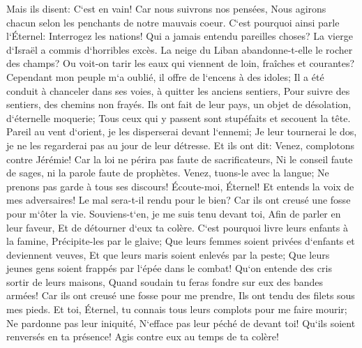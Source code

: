 \verse Mais ils disent: C`est en vain! Car nous suivrons nos pensées, Nous agirons chacun selon les penchants de notre mauvais coeur. 
\verse C`est pourquoi ainsi parle l`Éternel: Interrogez les nations! Qui a jamais entendu pareilles choses? La vierge d`Israël a commis d`horribles excès. 
\verse La neige du Liban abandonne-t-elle le rocher des champs? Ou voit-on tarir les eaux qui viennent de loin, fraîches et courantes? 
\verse Cependant mon peuple m`a oublié, il offre de l`encens à des idoles; Il a été conduit à chanceler dans ses voies, à quitter les anciens sentiers, Pour suivre des sentiers, des chemins non frayés. 
\verse Ils ont fait de leur pays, un objet de désolation, d`éternelle moquerie; Tous ceux qui y passent sont stupéfaits et secouent la tête. 
\verse Pareil au vent d`orient, je les disperserai devant l`ennemi; Je leur tournerai le dos, je ne les regarderai pas au jour de leur détresse. 
\verse Et ils ont dit: Venez, complotons contre Jérémie! Car la loi ne périra pas faute de sacrificateurs, Ni le conseil faute de sages, ni la parole faute de prophètes. Venez, tuons-le avec la langue; Ne prenons pas garde à tous ses discours! 
\verse Écoute-moi, Éternel! Et entends la voix de mes adversaires! 
\verse Le mal sera-t-il rendu pour le bien? Car ils ont creusé une fosse pour m`ôter la vie. Souviens-t`en, je me suis tenu devant toi, Afin de parler en leur faveur, Et de détourner d`eux ta colère. 
\verse C`est pourquoi livre leurs enfants à la famine, Précipite-les par le glaive; Que leurs femmes soient privées d`enfants et deviennent veuves, Et que leurs maris soient enlevés par la peste; Que leurs jeunes gens soient frappés par l`épée dans le combat! 
\verse Qu`on entende des cris sortir de leurs maisons, Quand soudain tu feras fondre sur eux des bandes armées! Car ils ont creusé une fosse pour me prendre, Ils ont tendu des filets sous mes pieds. 
\verse Et toi, Éternel, tu connais tous leurs complots pour me faire mourir; Ne pardonne pas leur iniquité, N`efface pas leur péché de devant toi! Qu`ils soient renversés en ta présence! Agis contre eux au temps de ta colère! 

